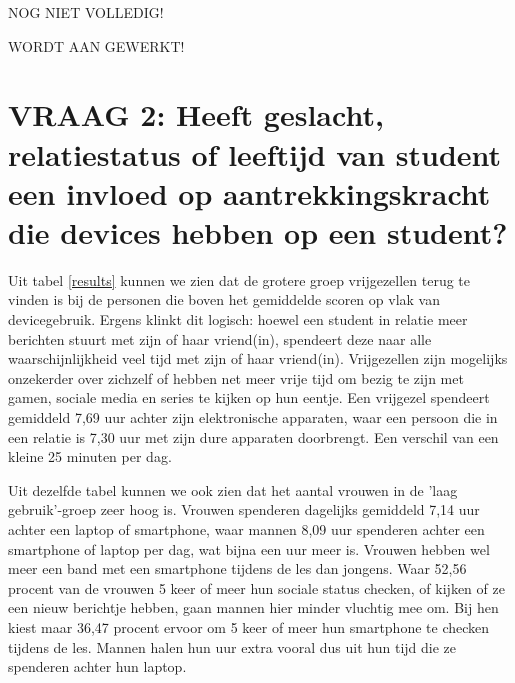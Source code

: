 NOG NIET VOLLEDIG! 

WORDT AAN GEWERKT!



\section{VRAAG 2: Heeft geslacht, relatiestatus of leeftijd van student een invloed op aantrekkingskracht die devices hebben op een student?}
\label{sec:geslacht-leeftijd}

Uit tabel \ref{results} kunnen we zien dat de grotere groep vrijgezellen terug te vinden is bij de personen die boven het gemiddelde scoren op vlak van devicegebruik. Ergens klinkt dit logisch: hoewel een student in relatie meer berichten stuurt met zijn of haar vriend(in), spendeert deze naar alle waarschijnlijkheid veel tijd met zijn of haar vriend(in). Vrijgezellen zijn mogelijks onzekerder over zichzelf of hebben net meer vrije tijd om bezig te zijn met gamen, sociale media en series te kijken op hun eentje. Een vrijgezel spendeert gemiddeld 7,69 uur achter zijn elektronische apparaten, waar een persoon die in een relatie is 7,30 uur met zijn dure apparaten doorbrengt. Een verschil van een kleine 25 minuten per dag.

Uit dezelfde tabel kunnen we ook zien dat het aantal vrouwen in de 'laag gebruik'-groep zeer hoog is. Vrouwen spenderen dagelijks gemiddeld 7,14 uur achter een laptop of smartphone, waar mannen 8,09 uur spenderen achter een smartphone of laptop per dag, wat bijna een uur meer is. 
Vrouwen hebben wel meer een band met een smartphone tijdens de les dan jongens. Waar 52,56 procent van de vrouwen 5 keer of meer hun sociale status checken, of kijken of ze een nieuw berichtje hebben, gaan mannen hier minder vluchtig mee om. Bij hen kiest maar 36,47 procent ervoor om 5 keer of meer hun smartphone te checken tijdens de les. Mannen halen hun uur extra vooral dus uit hun tijd die ze spenderen achter hun laptop.

